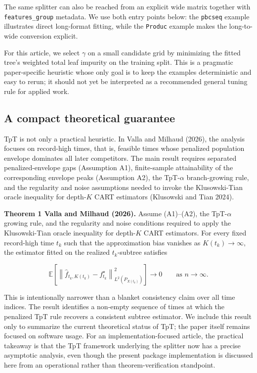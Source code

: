 \documentclass[
]{article}
\begin{document}
The same splitter can also be reached from an explicit wide matrix
together with \texttt{features\_group} metadata. We use both entry
points below: the \texttt{pbcseq} example illustrates direct long-format
fitting, while the \texttt{Produc} example makes the long-to-wide
conversion explicit.

For this article, we select \(\gamma\) on a small candidate grid by
minimizing the fitted tree's weighted total leaf impurity on the
training split. This is a pragmatic paper-specific heuristic whose only
goal is to keep the examples deterministic and easy to rerun; it should
not yet be interpreted as a recommended general tuning rule for applied
work.

\subsection{A compact theoretical
guarantee}\label{a-compact-theoretical-guarantee}

TpT is not only a practical heuristic. In Valla and Milhaud (2026), the
analysis focuses on record-high times, that is, feasible times whose
penalized population envelope dominates all later competitors. The main
result requires separated penalized-envelope gaps (Assumption A1),
finite-sample attainability of the corresponding envelope peaks
(Assumption A2), the TpT-\(\alpha\) branch-growing rule, and the
regularity and noise assumptions needed to invoke the Klusowski-Tian
oracle inequality for depth-\(K\) CART estimators (Klusowski and Tian
2024).

\textbf{Theorem 1 Valla and Milhaud (2026).} Assume (A1)--(A2), the
TpT-\(\alpha\) growing rule, and the regularity and noise conditions
required to apply the Klusowski-Tian oracle inequality for depth-\(K\)
CART estimators. For every fixed record-high time \(t_k\) such that the
approximation bias vanishes as \(K(t_k) \to \infty\), the estimator
fitted on the realized \(t_k\)-subtree satisfies

\[
\mathbb{E}\!\left[\left\lVert \hat f_{t_k, K(t_k)} - f_{t_k}^{\star} \right\rVert^2_{L^2(P_{X(t_k)})}\right]
\longrightarrow 0
\qquad \text{as } n \to \infty.
\]

This is intentionally narrower than a blanket consistency claim over all
time indices. The result identifies a non-empty sequence of times at
which the penalized TpT rule recovers a consistent subtree estimator. We
include this result only to summarize the current theoretical status of
TpT; the paper itself remains focused on software usage. For an
implementation-focused article, the practical takeaway is that the TpT
framework underlying the splitter now has a precise asymptotic analysis,
even though the present package implementation is discussed here from an
operational rather than theorem-verification standpoint.
\end{document}
